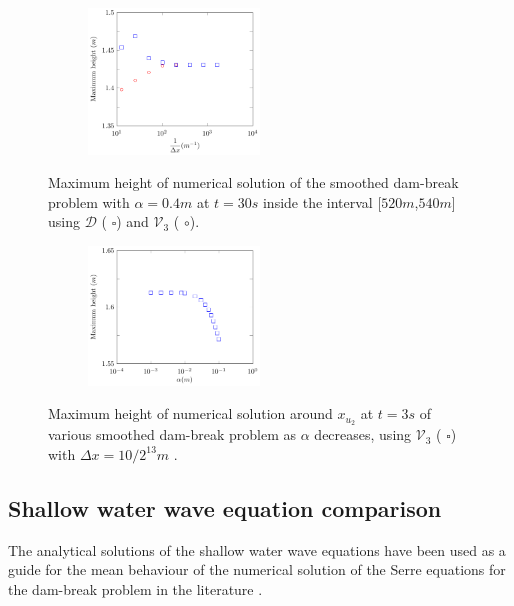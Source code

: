 \documentclass[times]{elsarticle}
\begin{document}
\begin{figure}
	\centering
	\begin{subfigure}{\textwidth}
		\centering
		\includegraphics[width=0.5\textwidth]{Figure-28.pdf}
	\end{subfigure}
	\caption{Maximum height of numerical solution of the smoothed dam-break problem with $\alpha = 0.4m$ at $t=30s$ inside the interval [$520m$,$540m$] using $\mathcal{D}$ ({\color{blue} $\square$}) and $\mathcal{V}_3$ ({\color{red} $\circ$}).}
	\label{fig:maxamp}
\end{figure}

\begin{figure}
	\centering
	\begin{subfigure}{\textwidth}
		\centering
		\includegraphics[width=0.5\textwidth]{Figure-29.pdf}
	\end{subfigure}
	\caption{Maximum height of numerical solution around $x_{u_2}$ at $t=3s$ of various smoothed dam-break problem as $\alpha$ decreases, using $\mathcal{V}_3$ ({\color{blue} $\square$}) with $\Delta x = 10 / 2^{13}m$ .}
	\label{fig:maxampa}
\end{figure}

\subsection{Shallow water wave equation comparison}
The analytical solutions of the shallow water wave equations have been used as a guide for the mean behaviour of the numerical solution of the Serre equations for the dam-break problem in the literature \cite{Hank-etal-2010-2034,Mitsotakis-etal-2014}.
\end{document}
